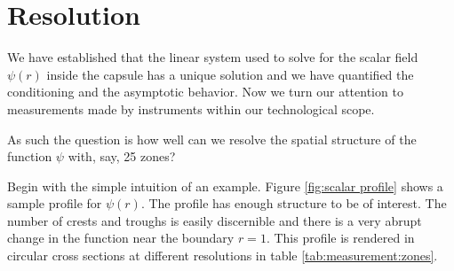 \section{\label{sec:measurement:resolution}Resolution}

We have established that the linear system used to solve for the scalar field $\psi(r)$ inside the capsule has a unique solution and we have quantified the conditioning and the asymptotic behavior. Now we turn our attention to measurements made by instruments within our technological scope.

As such the question is how well can we resolve the spatial structure of the function $\psi$ with, say, 25 zones?

Begin with the simple intuition of an example. Figure \eqref{fig:scalar profile} shows a sample profile for $\psi(r)$. The profile has enough structure to be of interest. The number of crests and troughs is easily discernible and there is a very abrupt change in the function near the boundary $r = 1$. This profile is rendered in circular cross sections at different resolutions in table \eqref{tab:measurement:zones}.

